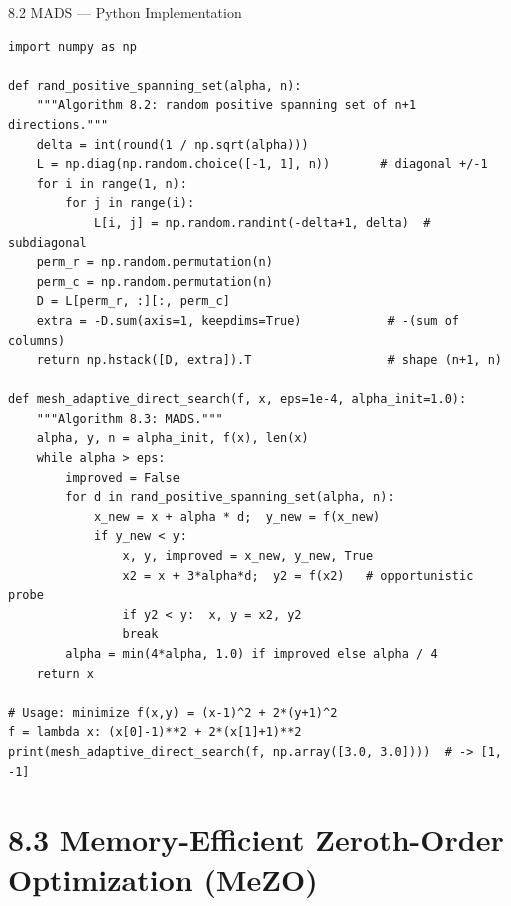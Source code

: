 \documentclass[aspectratio=169,10pt]{beamer}
\begin{document}
\begin{frame}[fragile]{8.2 MADS --- Python Implementation}
\begin{lstlisting}[caption={MADS: random positive spanning set + search (Algorithms 8.2 and 8.3)}]
import numpy as np

def rand_positive_spanning_set(alpha, n):
    """Algorithm 8.2: random positive spanning set of n+1 directions."""
    delta = int(round(1 / np.sqrt(alpha)))
    L = np.diag(np.random.choice([-1, 1], n))       # diagonal +/-1
    for i in range(1, n):
        for j in range(i):
            L[i, j] = np.random.randint(-delta+1, delta)  # subdiagonal
    perm_r = np.random.permutation(n)
    perm_c = np.random.permutation(n)
    D = L[perm_r, :][:, perm_c]
    extra = -D.sum(axis=1, keepdims=True)            # -(sum of columns)
    return np.hstack([D, extra]).T                   # shape (n+1, n)

def mesh_adaptive_direct_search(f, x, eps=1e-4, alpha_init=1.0):
    """Algorithm 8.3: MADS."""
    alpha, y, n = alpha_init, f(x), len(x)
    while alpha > eps:
        improved = False
        for d in rand_positive_spanning_set(alpha, n):
            x_new = x + alpha * d;  y_new = f(x_new)
            if y_new < y:
                x, y, improved = x_new, y_new, True
                x2 = x + 3*alpha*d;  y2 = f(x2)   # opportunistic probe
                if y2 < y:  x, y = x2, y2
                break
        alpha = min(4*alpha, 1.0) if improved else alpha / 4
    return x

# Usage: minimize f(x,y) = (x-1)^2 + 2*(y+1)^2
f = lambda x: (x[0]-1)**2 + 2*(x[1]+1)**2
print(mesh_adaptive_direct_search(f, np.array([3.0, 3.0])))  # -> [1, -1]
\end{lstlisting}
\end{frame}

\section{8.3 Memory-Efficient Zeroth-Order Optimization (MeZO)}
\end{document}
